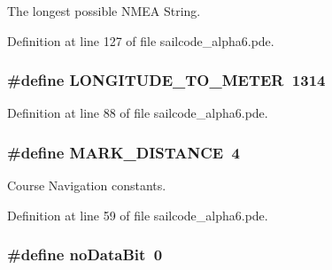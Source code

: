 \-The longest possible \-N\-M\-E\-A \-String. 



\-Definition at line 127 of file sailcode\-\_\-alpha6.\-pde.

\hypertarget{group__globalconstants_ga5944046f3cb8cd99f5f71c1327ef8bc7}{
\subsubsection[{\-L\-O\-N\-G\-I\-T\-U\-D\-E\-\_\-\-T\-O\-\_\-\-M\-E\-T\-E\-R}]{\setlength{\rightskip}{0pt plus 5cm}\#define \-L\-O\-N\-G\-I\-T\-U\-D\-E\-\_\-\-T\-O\-\_\-\-M\-E\-T\-E\-R~1314}}
\label{group__globalconstants_ga5944046f3cb8cd99f5f71c1327ef8bc7}


\-Definition at line 88 of file sailcode\-\_\-alpha6.\-pde.

\hypertarget{group__globalconstants_ga19af76681fc030672f41555a55f8e8db}{
\subsubsection[{\-M\-A\-R\-K\-\_\-\-D\-I\-S\-T\-A\-N\-C\-E}]{\setlength{\rightskip}{0pt plus 5cm}\#define \-M\-A\-R\-K\-\_\-\-D\-I\-S\-T\-A\-N\-C\-E~4}}
\label{group__globalconstants_ga19af76681fc030672f41555a55f8e8db}


\-Course \-Navigation constants. 



\-Definition at line 59 of file sailcode\-\_\-alpha6.\-pde.

\hypertarget{group__globalconstants_ga1bc4f63dcd0b30d09b7e320d0595695c}{
\subsubsection[{no\-Data\-Bit}]{\setlength{\rightskip}{0pt plus 5cm}\#define no\-Data\-Bit~0}}
\label{group__globalconstants_ga1bc4f63dcd0b30d09b7e320d0595695c}


